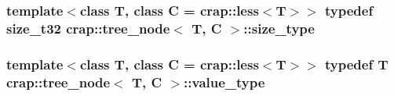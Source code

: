 \hypertarget{structcrap_1_1tree__node_a78f219a12c6715d77966184e41efc4cd}{
\subsubsection[{size\-\_\-type}]{\setlength{\rightskip}{0pt plus 5cm}template$<$class T, class C = crap\-::less$<$\-T$>$$>$ typedef {\bf size\-\_\-t32} {\bf crap\-::tree\-\_\-node}$<$ T, C $>$\-::{\bf size\-\_\-type}}}\label{structcrap_1_1tree__node_a78f219a12c6715d77966184e41efc4cd}
\hypertarget{structcrap_1_1tree__node_a3550078366894313cdaa29f2fe684587}{
\subsubsection[{value\-\_\-type}]{\setlength{\rightskip}{0pt plus 5cm}template$<$class T, class C = crap\-::less$<$\-T$>$$>$ typedef T {\bf crap\-::tree\-\_\-node}$<$ T, C $>$\-::{\bf value\-\_\-type}}}\label{structcrap_1_1tree__node_a3550078366894313cdaa29f2fe684587}


